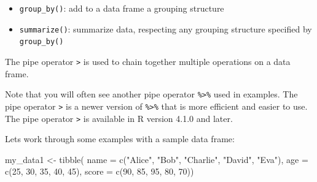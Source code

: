 \documentclass[
  letterpaper,
  8pt,
  a4paper]{book}
\newenvironment{Shaded}{\begin{snugshade}}{\end{snugshade}}
\newcommand{\AttributeTok}[1]{\textcolor[rgb]{0.40,0.45,0.13}{#1}}
\newcommand{\DecValTok}[1]{\textcolor[rgb]{0.68,0.00,0.00}{#1}}
\newcommand{\FunctionTok}[1]{\textcolor[rgb]{0.28,0.35,0.67}{#1}}
\newcommand{\NormalTok}[1]{\textcolor[rgb]{0.00,0.23,0.31}{#1}}
\newcommand{\OtherTok}[1]{\textcolor[rgb]{0.00,0.23,0.31}{#1}}
\newcommand{\StringTok}[1]{\textcolor[rgb]{0.13,0.47,0.30}{#1}}
\providecommand{\tightlist}{%
  \setlength{\itemsep}{0pt}\setlength{\parskip}{0pt}}
\begin{document}
\begin{itemize}
\tightlist
\item
  \texttt{group\_by()}: add to a data frame a grouping structure
\item
  \texttt{summarize()}: summarize data, respecting any grouping
  structure specified by \texttt{group\_by()}
\end{itemize}

The pipe operator \texttt{\textbar{}\textgreater{}} is used to chain
together multiple operations on a data frame.

\begin{tcolorbox}[enhanced jigsaw, arc=.35mm, bottomrule=.15mm, bottomtitle=1mm, breakable, colback=white, colbacktitle=quarto-callout-tip-color!10!white, colframe=quarto-callout-tip-color-frame, coltitle=black, left=2mm, leftrule=.75mm, opacityback=0, opacitybacktitle=0.6, rightrule=.15mm, title=\textcolor{quarto-callout-tip-color}{\faLightbulb}\hspace{0.5em}{Tip}, titlerule=0mm, toprule=.15mm, toptitle=1mm]

Note that you will often see another pipe operator
\texttt{\%\textgreater{}\%} used in examples. The pipe operator
\texttt{\textbar{}\textgreater{}} is a newer version of
\texttt{\%\textgreater{}\%} that is more efficient and easier to use.
The pipe operator \texttt{\textbar{}\textgreater{}} is available in R
version 4.1.0 and later.

\end{tcolorbox}

Lets work through some examples with a sample data frame:

\begin{Shaded}
\begin{Highlighting}[]
\NormalTok{my\_data1 }\OtherTok{\textless{}{-}} \FunctionTok{tibble}\NormalTok{(}
  \AttributeTok{name =} \FunctionTok{c}\NormalTok{(}\StringTok{"Alice"}\NormalTok{, }\StringTok{"Bob"}\NormalTok{, }\StringTok{"Charlie"}\NormalTok{, }\StringTok{"David"}\NormalTok{, }\StringTok{"Eva"}\NormalTok{),}
  \AttributeTok{age =} \FunctionTok{c}\NormalTok{(}\DecValTok{25}\NormalTok{, }\DecValTok{30}\NormalTok{, }\DecValTok{35}\NormalTok{, }\DecValTok{40}\NormalTok{, }\DecValTok{45}\NormalTok{),}
  \AttributeTok{score =} \FunctionTok{c}\NormalTok{(}\DecValTok{90}\NormalTok{, }\DecValTok{85}\NormalTok{, }\DecValTok{95}\NormalTok{, }\DecValTok{80}\NormalTok{, }\DecValTok{70}\NormalTok{))}
\end{Highlighting}
\end{Shaded}
\end{document}
